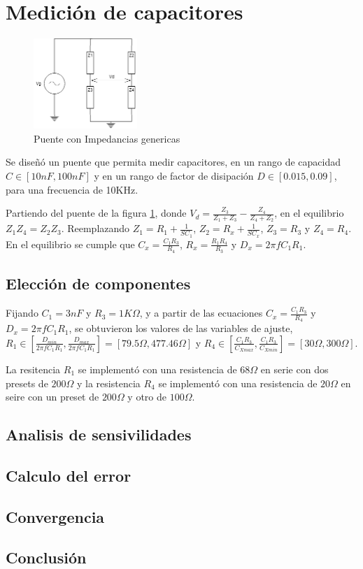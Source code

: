 \documentclass[../../main.tex]{subfiles}
\begin{document}
\section{Medición de capacitores}

\begin{figure}[H]	
	\centering
	\includegraphics[width=0.35\textwidth]{fotos/PuenteGen.png}
	\caption{Puente con Impedancias genericas} \label{fig:pgc}
\end{figure}

Se diseñó un puente que permita medir capacitores, en un rango de capacidad $C \in [10nF,100nF]$ y en un rango de factor de disipación $D \in[0.015 , 0.09 ] $, para una frecuencia de 10KHz. 
\par Partiendo del puente de la figura \ref{fig:pgc}, donde $V_d=\frac{Z_3}{Z_1+Z_3} -\frac{Z_4}{Z_4 + Z_2}$, en el equilibrio $Z_1 Z_4 = Z_2  Z_3$.  Reemplazando $Z_1= R_1 + \frac{1}{SC_1}$, $Z_2= R_x + \frac{1}{SC_x}$, $Z_3=R_3$ y $Z_4=R_4$. En el equilibrio se cumple que $C_x=\frac{C_1 R_3}{R_4}$, $R_x=\frac{R_1 R_4}{R_3}$ y $D_x=2 \pi f C_1 R_1$.

\subsection{Elección de componentes}
Fijando $C_1=3nF$ y $R_3=1K \Omega$, y a partir de las ecuaciones  $C_x=\frac{C_1 R_3}{R_4}$ y $D_x=2 \pi f C_1 R_1$, se obtuvieron los valores de las variables de ajuste, $R_1 \in \left[  \frac{D_{min}}{2 \pi f C_1 R_1} ,  \frac{D_{max}}{2 \pi f C_1 R_1}  \right] = \left[ 79.5\Omega , 477.46 \Omega   \right]$ y 
$R_4 \in \left[ \frac{C_1 R_3}{C_{Xmax}} , \frac{C_1 R_3}{C_{Xmin}} \right]=   \left[ 30\Omega , 300 \Omega   \right]$.
\par La resitencia $R_1$ se implementó con una resistencia de $68 \Omega$ en serie con dos presets de $200 \Omega$ y la resistencia $R_4$ se implementó con una resistencia de $20\Omega$ en seire con un preset de $200 \Omega$ y otro de $100 \Omega$.

\subsection{Analisis de sensivilidades}

\subsection{Calculo del error}

\subsection{Convergencia}

\subsection{Conclusión}
\end{document}
